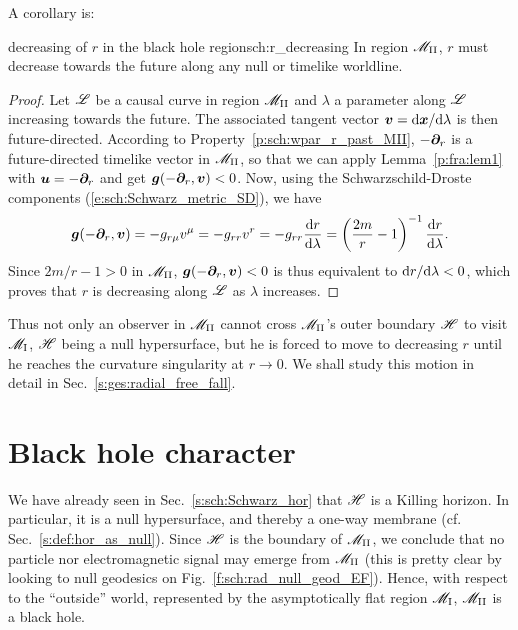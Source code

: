 A corollary is:
\begin{tprop}{decreasing of $r$ in the black hole region}{sch:r_decreasing}
In region $\mathscr{M}_{\rm II}$, $r$ must decrease towards the future
along any null or timelike worldline.
\end{tprop}

\begin{proof}
Let $\mathscr{L}$ be a causal curve in region $\mathscr{M}_{\rm II}$ and $\lambda$ a parameter
along $\mathscr{L}$ increasing towards the future.
The associated tangent vector
$\bm{v} = \mathrm{d}\bm{x}/\mathrm{d}\lambda$ is then future-directed.
According to Property~\ref{p:sch:wpar_r_past_MII}, $-\bm{\partial}_r$ is a future-directed timelike vector
in $\mathscr{M}_{\rm II}$, so that we can apply Lemma~\ref{p:fra:lem1}
with $\bm{u} = - \bm{\partial}_r$ and get $\bm{g}(-\bm{\partial}_r, \bm{v}) < 0$.
Now, using the Schwarzschild-Droste
components (\ref{e:sch:Schwarz_metric_SD}), we have
\[
    \bm{g}(-\bm{\partial}_r, \bm{v}) = - g_{r\mu} v^\mu = - g_{rr} v^r = - g_{rr} \frac{\mathrm{d} r}{\mathrm{d} \lambda}
    = \left(\frac{2m}{r} - 1 \right)^{-1} \frac{\mathrm{d} r}{\mathrm{d} \lambda} .
\]
Since $2m/r - 1 > 0$ in $\mathscr{M}_{\rm II}$, $\bm{g}(-\bm{\partial}_r, \bm{v}) < 0$
is thus equivalent to $\mathrm{d} r/ \mathrm{d}\lambda < 0$, which proves that $r$ is decreasing
along $\mathscr{L}$ as $\lambda$ increases.
\end{proof}
Thus not only an observer in $\mathscr{M}_{\rm II}$ cannot cross $\mathscr{M}_{\rm II}$'s outer boundary
$\mathscr{H}$ to visit $\mathscr{M}_{\rm I}$, $\mathscr{H}$ being a null hypersurface, but he is forced
to move to decreasing $r$ until he reaches the curvature singularity at $r\rightarrow 0$.
We shall study this motion in detail in Sec.~\ref{s:ges:radial_free_fall}.



\section{Black hole character} \label{s:sch:BH}

We have already seen in Sec.~\ref{s:sch:Schwarz_hor} that $\mathscr{H}$ is
a Killing horizon. In particular, it is a null hypersurface, and thereby a
one-way membrane (cf. Sec.~\ref{s:def:hor_as_null}).
Since $\mathscr{H}$ is the boundary of $\mathscr{M}_{\rm II}$, we conclude that no particle nor
electromagnetic signal may emerge from $\mathscr{M}_{\rm II}$
(this is pretty clear by looking to null geodesics on
Fig.~\ref{f:sch:rad_null_geod_EF}). Hence, with respect to the ``outside''
world, represented by the asymptotically flat region $\mathscr{M}_{\rm I}$,
$\mathscr{M}_{\rm II}$ is a black hole.

